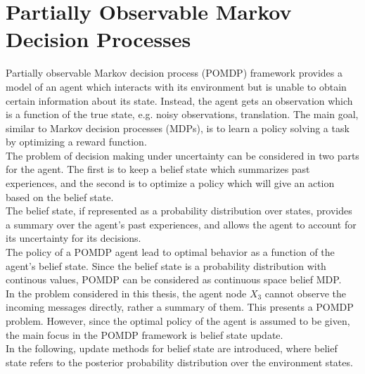 \section{Partially Observable Markov Decision Processes}
\label{sec:belief_POMDP}
Partially observable Markov decision process (POMDP) framework provides a model of an agent which interacts with its environment but is unable to obtain certain information about its state. Instead, the agent gets an observation which is a function of the true state, e.g. noisy observations, translation. The main goal, similar to Markov decision processes (MDPs), is to learn a policy solving a task by optimizing a reward function. \\
The problem of decision making under uncertainty can be considered in two parts for the agent. The first is to keep a belief state which summarizes past experiences, and the second is to optimize a policy which will give an action based on the belief state. \cite{KAELBLING199899,Murphy2000}\\
The belief state, if represented as a probability distribution over states, provides a summary over the agent's past experiences, and allows the agent to account for its uncertainty for its decisions. \\
The policy of a POMDP agent lead to optimal behavior as a function of the agent's belief state. Since the belief state is a probability distribution with continous values, POMDP can be considered as continuous space belief MDP. \cite{KAELBLING199899}\\
In the problem considered in this thesis, the agent node $ X_{3} $ cannot observe the incoming messages directly, rather a summary of them. This presents a POMDP problem. However, since the optimal policy of the agent is assumed to be given, the main focus in the POMDP framework is belief state update. \\
In the following, update methods for belief state are introduced, where belief state refers to the posterior probability distribution over the environment states.

